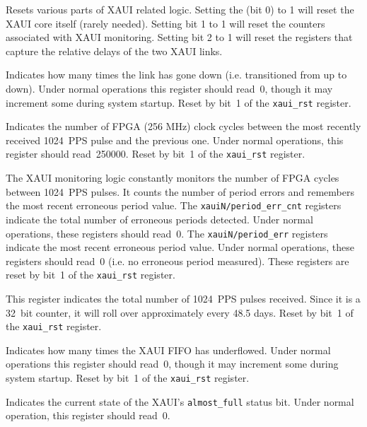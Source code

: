 \documentclass[12pt]{article}
\begin{document}
\begin{description}
  Resets various parts of XAUI related logic.  Setting the
\LSb (bit 0) to 1 will reset the XAUI core itself (rarely needed).  Setting bit
1 to 1 will reset the counters associated with XAUI monitoring.  Setting bit 2
to 1 will reset the registers that capture the relative delays of the two XAUI
links.

 Indicates how many times the link has gone down
(i.e. transitioned from up to down).  Under normal operations this register
should read~0, though it may increment some during system startup.
Reset by bit~1 of the \verb|xaui_rst| register.

Indicates the number of FPGA (256 MHz) clock cycles between the most recently
received 1024~PPS pulse and the previous one.  Under normal operations, this
register should read~250000.
Reset by bit~1 of the \verb|xaui_rst| register.

The XAUI monitoring logic constantly monitors the number of FPGA cycles between
1024~PPS pulses.  It counts the number of period errors and remembers the most
recent erroneous period value.  The \verb|xauiN/period_err_cnt| registers
indicate the total number of erroneous periods detected.  Under normal
operations, these registers should read~0.  The \verb|xauiN/period_err|
registers indicate the most recent erroneous period value.  Under normal
operations, these registers should read~0 (i.e. no erroneous period measured).
These registers are reset by bit~1 of the \verb|xaui_rst| register.

 This register indicates the total number of 1024~PPS
pulses received.  Since it is a 32~bit counter, it will roll over approximately
every 48.5 days.
Reset by bit~1 of the \verb|xaui_rst| register.

 Indicates how many times the XAUI FIFO has
underflowed.  Under normal operations this register should read~0, though it
may increment some during system startup.
Reset by bit~1 of the \verb|xaui_rst| register.

 Indicates the current state of the XAUI's
\verb|almost_full| status bit.  Under normal operation, this register should
read~0.


\end{description}
\end{document}
